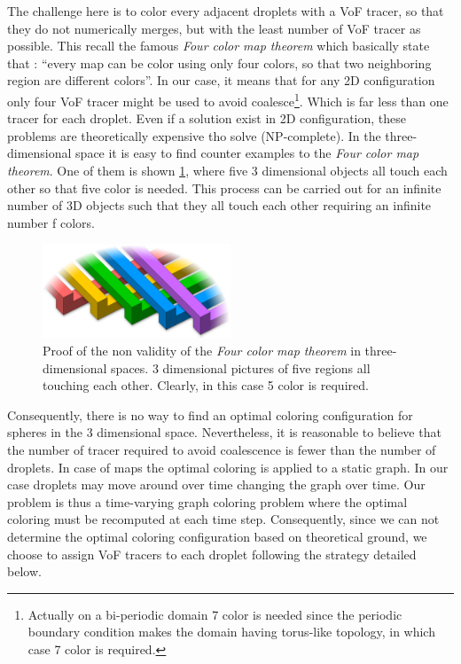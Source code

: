 The challenge here is to color every adjacent droplets with a VoF tracer, so that they do not numerically merges, but with the least number of VoF tracer as possible. 
This recall the famous \textit{Four color map theorem} \citep{kempe1879colours} which basically state that : 
\enquote{every map can be color using only four colors, so that two neighboring region are different colors}. 
In our case, it means that for any 2D configuration only four VoF tracer might be used to avoid coalesce\footnote{Actually on a bi-periodic domain 7 color is needed since the periodic boundary condition makes the domain having torus-like topology, in which case 7 color is required.  }. 
Which is far less than one tracer for each droplet. 
Even if a solution exist in 2D configuration, these problems are theoretically expensive tho solve (NP-complete).  
In the three-dimensional space it is easy to find counter examples to the \textit{Four color map theorem}. 
One of them is shown \ref{fig:colors}, where five 3 dimensional objects all touch each other so that five color is needed. 
This process can be carried out for an infinite number of 3D objects such that they all touch each other requiring an infinite number f colors. 
\begin{figure}
    \centering
    \includegraphics[width=0.5\textwidth]{image/more_than_four.png}
    \caption{
    Proof of the non validity of the \textit{Four color map theorem} in three-dimensional spaces. 
    3 dimensional pictures of five regions all touching each other. 
    Clearly, in this case 5 color is required. 
    }
    \label{fig:colors}
\end{figure}
Consequently, there is no way to find an optimal coloring configuration for spheres in the 3 dimensional space. 
Nevertheless, it is reasonable to believe that the number of tracer required to avoid coalescence is fewer than the number of droplets. 
In case of maps the optimal coloring is applied to a static graph. 
In our case droplets may move around over time changing the graph over time. 
Our problem is thus a time-varying graph coloring problem where the optimal coloring must be recomputed at each time step.
Consequently, since we can not determine the optimal coloring configuration based on theoretical ground, we choose to assign VoF tracers to each droplet following the strategy detailed below.

